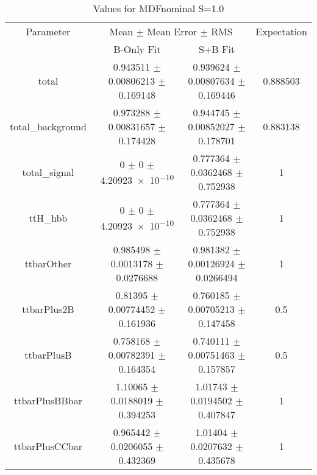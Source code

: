 \begin{table}
\centering
\caption{Values for MDFnominal S=1.0}
\begin{tabular}{cccc}
\toprule
Parameter & \multicolumn{2}{c}{Mean $\pm$ Mean Error $\pm$ RMS} & Expectation\\
 & B-Only Fit & S+B Fit & \\
\midrule
total & \num{0.943511} $\pm$ \num{0.00806213} $\pm$ \num{0.169148} & \num{0.939624} $\pm$ \num{0.00807634} $\pm$ \num{0.169446} & \num{0.888503}\\
total\_background & \num{0.973288} $\pm$ \num{0.00831657} $\pm$ \num{0.174428} & \num{0.944745} $\pm$ \num{0.00852027} $\pm$ \num{0.178701} & \num{0.883138}\\
total\_signal & \num{0} $\pm$ \num{0} $\pm$ \num{4.20923e-10} & \num{0.777364} $\pm$ \num{0.0362468} $\pm$ \num{0.752938} & \num{1}\\
ttH\_hbb & \num{0} $\pm$ \num{0} $\pm$ \num{4.20923e-10} & \num{0.777364} $\pm$ \num{0.0362468} $\pm$ \num{0.752938} & \num{1}\\
ttbarOther & \num{0.985498} $\pm$ \num{0.0013178} $\pm$ \num{0.0276688} & \num{0.981382} $\pm$ \num{0.00126924} $\pm$ \num{0.0266494} & \num{1}\\
ttbarPlus2B & \num{0.81395} $\pm$ \num{0.00774452} $\pm$ \num{0.161936} & \num{0.760185} $\pm$ \num{0.00705213} $\pm$ \num{0.147458} & \num{0.5}\\
ttbarPlusB & \num{0.758168} $\pm$ \num{0.00782391} $\pm$ \num{0.164354} & \num{0.740111} $\pm$ \num{0.00751463} $\pm$ \num{0.157857} & \num{0.5}\\
ttbarPlusBBbar & \num{1.10065} $\pm$ \num{0.0188019} $\pm$ \num{0.394253} & \num{1.01743} $\pm$ \num{0.0194502} $\pm$ \num{0.407847} & \num{1}\\
ttbarPlusCCbar & \num{0.965442} $\pm$ \num{0.0206055} $\pm$ \num{0.432369} & \num{1.01404} $\pm$ \num{0.0207632} $\pm$ \num{0.435678} & \num{1}\\
\bottomrule
\end{tabular}
\end{table}